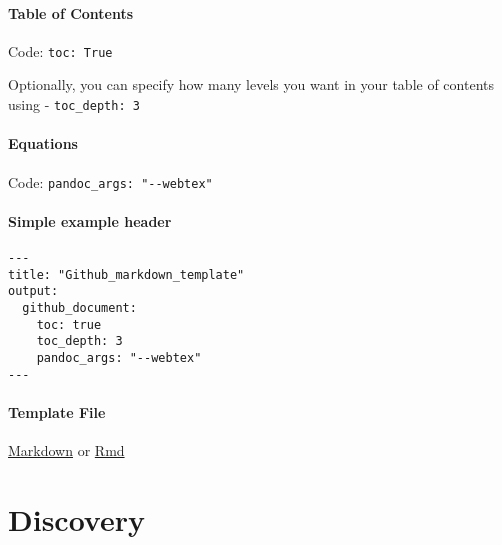 \documentclass[
  letterpaper,
  DIV=11,
  numbers=noendperiod]{scrreprt}
\begin{document}
\hypertarget{table-of-contents-2}{%
\subsection*{\texorpdfstring{\textbf{Table of
Contents}}{Table of Contents}}\label{table-of-contents-2}}

Code: \texttt{toc:\ True}

Optionally, you can specify how many levels you want in your table of
contents using - \texttt{toc\_depth:\ 3}

\hypertarget{equations}{%
\subsection*{\texorpdfstring{\textbf{Equations}}{Equations}}\label{equations}}

Code: \texttt{pandoc\_args:\ "-\/-webtex"}

\hypertarget{simple-example-header}{%
\subsection*{\texorpdfstring{\textbf{Simple example
header}}{Simple example header}}\label{simple-example-header}}

\begin{verbatim}
---
title: "Github_markdown_template"
output: 
  github_document:
    toc: true
    toc_depth: 3
    pandoc_args: "--webtex"
---
\end{verbatim}

\hypertarget{template-file}{%
\subsection*{\texorpdfstring{\textbf{Template
File}}{Template File}}\label{template-file}}

\href{https://github.com/DrK-Lo/lotterhoslabprotocols/blob/gh-pages/_data/github_markdown_template.md}{Markdown}
or
\href{https://github.com/DrK-Lo/lotterhoslabprotocols/blob/gh-pages/_data/github_markdown_template.Rmd}{Rmd}

\part{Discovery}
\end{document}
